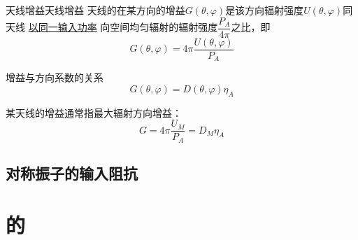         \begin{definition}{天线增益}{天线增益}
            天线的在某方向的增益$G(\theta,\varphi)$是该方向辐射强度$U(\theta,\varphi)$同天线 \underline{以同一输入功率} 向空间均匀辐射的辐射强度$\dfrac{P_A}{4\pi}$之比，即
            \begin{equation}
                G(\theta,\varphi)=4\pi \frac{U(\theta,\varphi)}{P_A}
            \end{equation}

            增益与方向系数的关系
            \begin{equation}
                G(\theta,\varphi)=D(\theta,\varphi)\eta_A
            \end{equation}

            某天线的增益通常指最大辐射方向增益：
            \begin{equation}
                G=4\pi \frac{U_M}{P_A}=D_M\eta_A
            \end{equation}
        \end{definition}

        
    \subsection{对称振子的输入阻抗}
    
\section{的}
